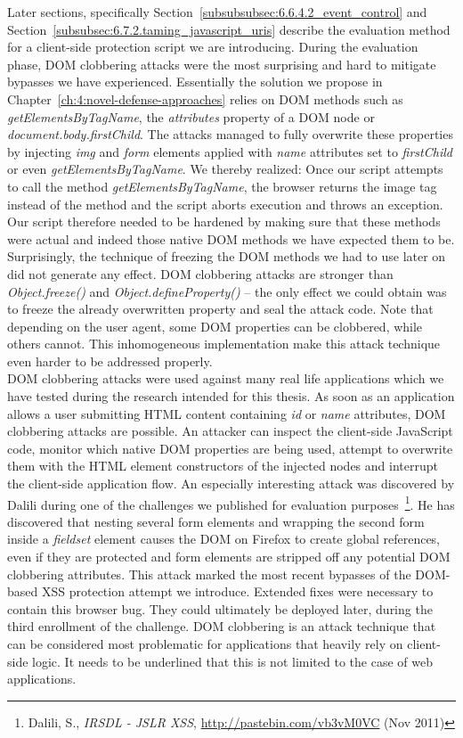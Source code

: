     Later sections, specifically Section~\ref{subsubsubsec:6.6.4.2_event_control} and Section~\ref{subsubsec:6.7.2.taming_javascript_uris} describe the evaluation method for a client-side protection script we are introducing. During the evaluation phase, DOM clobbering attacks were the most surprising and hard to mitigate bypasses we have experienced. Essentially the solution we propose in Chapter~\ref{ch:4:novel-defense-approaches} relies on DOM methods such as \textit{getElementsByTagName}, the \textit{attributes} property of a DOM node or \textit{document.body.firstChild}. The attacks managed to fully overwrite these properties by injecting \textit{img} and \textit{form} elements applied with \textit{name} attributes set to \textit{firstChild} or even \textit{getElementsByTagName}. We thereby realized: Once our script attempts to call the method \textit{getElementsByTagName}, the browser returns the image tag instead of the method and the script aborts execution and throws an exception. Our script 
therefore needed to be hardened by making sure that these methods were actual and indeed those native DOM methods we have expected them to be. Surprisingly, the technique of freezing the DOM methods we had to use later on did not generate any effect. DOM clobbering attacks are stronger than \textit{Object.freeze()} and \textit{Object.defineProperty()} -- the only effect we could obtain was to freeze the already overwritten property and seal the attack code. Note that depending on the user agent, some DOM properties can be clobbered, while others cannot. This inhomogeneous implementation make this attack technique even harder to be addressed properly.\\

    DOM clobbering attacks were used against many real life applications which we have tested during the research intended for this thesis. As soon as an application allows a user submitting HTML content containing \textit{id} or \textit{name} attributes, DOM clobbering attacks are possible. An attacker can inspect the client-side JavaScript code, monitor which native DOM properties are being used, attempt to overwrite them with the HTML element constructors of the injected nodes and interrupt the client-side application flow. An especially interesting attack was discovered by Dalili during one of the challenges we published for evaluation purposes~\footnote{Dalili, S., \textit{IRSDL - JSLR XSS}, \url{http://pastebin.com/vb3vM0VC} (Nov 2011)}. He has discovered that nesting several form elements and wrapping the second form inside a \textit{fieldset} element causes the DOM on Firefox to create global references, even if they are protected and form elements are stripped off any potential DOM clobbering 
attributes. This attack marked the most recent bypasses of the DOM-based XSS protection attempt we introduce. Extended fixes were necessary to contain this browser bug. They could ultimately be deployed later, during the third enrollment of the challenge. DOM clobbering is an attack technique that can be considered most problematic for applications that heavily rely on client-side logic. It needs to be underlined that this is not limited to the case of web applications.

